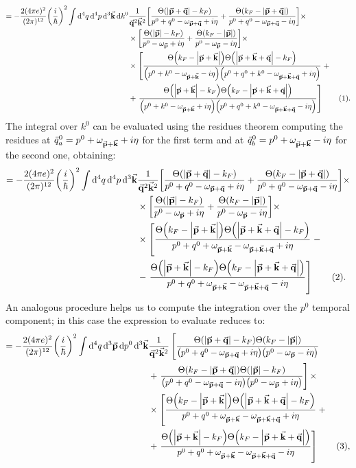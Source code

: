 \documentclass[a4paper]{article}
\newcommand{\numberthis}{\addtocounter{equation}{1}\tag{\theequation}}
\newcommand{\Ta}{\Theta\pqty{\abs{\va{p}+\va{q}}-k_F}}
\newcommand{\Taa}{\Theta\pqty{k_F - \abs{\va{p}+\va{q}}}}
\newcommand{\Tb}{\Theta\pqty{\abs{\va{p} + \va{k} + \va{q}}-k_F}}
\newcommand{\Tbb}{\Theta\pqty{k_F - \abs{\va{p} + \va{k} + \va{q}}}}
\newcommand{\Tc}{\Theta\pqty{\abs{\va{p}+\va{k}}-k_F}}
\newcommand{\Tcc}{\Theta\pqty{k_F -\abs{\va{p}+\va{k}}}}
\newcommand{\Td}{\Theta\pqty{\abs{\va{p}}-k_F}}
\newcommand{\Tdd}{\Theta\pqty{k_F -\abs{\va{p}}}}
\begin{document}
\begin{align*}
= -\frac{2(4\pi e)^2}{(2\pi)^{12}} \pqty{\frac{i}{\hbar}}^2 \int \dd[4]{q}\dd[4]{p}\dd[3]{\va{k}}\dd{k^0}&\frac{1}{\va{q}^2 \va{k}^2}
\bqty{\frac{\Ta}{p^0 +q^0 -\omega_{\va{p} + \va{q}} + i\eta} + \frac{\Taa}{p^0+q^0 -\omega_{\va{p}+\va{q}}-i\eta}}\times\\
&\times \bqty{\frac{\Td}{p^0 - \omega_{\va{p}}+i\eta} + \frac{\Tdd}{p^0 - \omega_{\va{p}}-i\eta} }\times\\
&\times \left[\frac{\Tcc\Tb}{\pqty{p^0+k^0 - \omega_{\va{p}+\va{k}}-i\eta}\pqty{p^0+q^0+k^0 - \omega_{\va{p}+\va{k}+\va{q}}+i\eta}} \right.+\\
&+\left. \frac{\Tc\Tbb}{\pqty{p^0+k^0 - \omega_{\va{p}+\va{k}}+i\eta}\pqty{p^0+q^0+k^0 - \omega_{\va{p}+\va{k}+\va{q}}-i\eta}}\right]\numberthis .
\end{align*}
The integral over $k^0$ can be evaluated using the residues theorem computing the residues at $\bar{q}^0_a = p^0 +\omega_{\va{p}+\va{k}} +i\eta$ for the first term and at $\bar{q}^0_b = p^0 +\omega_{\va{p}+\va{k}} -i\eta$ for the second one, obtaining:
\begin{align*}
= -\frac{2(4\pi e)^2}{(2\pi)^{12}} \pqty{\frac{i}{\hbar}}^2 \int \dd[4]{q}\dd[4]{p}\dd[3]{\va{k}}&\frac{1}{\va{q}^2 \va{k}^2}
\bqty{\frac{\Ta}{p^0 +q^0 -\omega_{\va{p} + \va{q}} + i\eta} + \frac{\Taa}{p^0+q^0 -\omega_{\va{p}+\va{q}}-i\eta}}\times\\
&\times \bqty{\frac{\Td}{p^0 - \omega_{\va{p}}+i\eta} + \frac{\Tdd}{p^0 - \omega_{\va{p}}-i\eta} }\times\\
&\times \left[\frac{\Tcc\Tb}{p^0+q^0+ \omega_{\va{p}+\va{k}}- \omega_{\va{p}+\va{k}+\va{q}}+i\eta} \right.-\\
&-\left. \frac{\Tc\Tbb}{p^0+q^0+ \omega_{\va{p}+\va{k}}- \omega_{\va{p}+\va{k}+\va{q}}-i\eta}\right]\numberthis .
\end{align*}
An analogous procedure helps us to compute the integration over the $p^0$ temporal component; in this case the expression to evaluate reduces to:
\begin{align*}
= -\frac{2(4\pi e)^2}{(2\pi)^{12}} \pqty{\frac{i}{\hbar}}^2 \int \dd[4]{q}\dd[3]{\va{p}}\dd{p^0}\dd[3]{\va{k}}&\frac{1}{\va{q}^2 \va{k}^2}
\left[\frac{\Ta\Tdd}{\pqty{p^0 +q^0 -\omega_{\va{p} + \va{q}} + i\eta}\pqty{ p^0 - \omega_{\va{p}}-i\eta}}\right.\\
& + \left.\frac{\Taa\Td}{\pqty{p^0 +q^0 -\omega_{\va{p} + \va{q}} - i\eta}\pqty{ p^0 - \omega_{\va{p}}+i\eta}}\right]\times\\
&\times \left[\frac{\Tcc\Tb}{p^0+q^0+ \omega_{\va{p}+\va{k}}- \omega_{\va{p}+\va{k}+\va{q}}+i\eta} \right.+\\
&+\left. \frac{\Tc\Tbb}{p^0+q^0+ \omega_{\va{p}+\va{k}}- \omega_{\va{p}+\va{k}+\va{q}}-i\eta}\right]\numberthis,
\end{align*}
\end{document}
